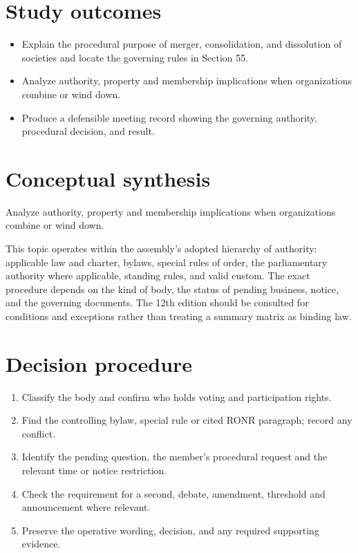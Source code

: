 \documentclass[11pt]{article}
\begin{document}
\SuiteOpen
{}
\section{Study outcomes}
\begin{itemize}[leftmargin=*,itemsep=4pt]
\item Explain the procedural purpose of merger, consolidation, and dissolution of societies and locate the governing rules in Section 55.
\item Analyze authority, property and membership implications when organizations combine or wind down.
\item Produce a defensible meeting record showing the governing authority, procedural decision, and result.
\end{itemize}

\section{Conceptual synthesis}
Analyze authority, property and membership implications when organizations combine or wind down.

This topic operates within the assembly’s adopted hierarchy of authority: applicable law and charter, bylaws, special rules of order, the parliamentary authority where applicable, standing rules, and valid custom. The exact procedure depends on the kind of body, the status of pending business, notice, and the governing documents. The 12th edition should be consulted for conditions and exceptions rather than treating a summary matrix as binding law.
\section{Decision procedure}
\begin{enumerate}[leftmargin=*,itemsep=4pt]
\item Classify the body and confirm who holds voting and participation rights.
\item Find the controlling bylaw, special rule or cited RONR paragraph; record any conflict.
\item Identify the pending question, the member’s procedural request and the relevant time or notice restriction.
\item Check the requirement for a second, debate, amendment, threshold and announcement where relevant.
\item Preserve the operative wording, decision, and any required supporting evidence.
\end{enumerate}
\end{document}
